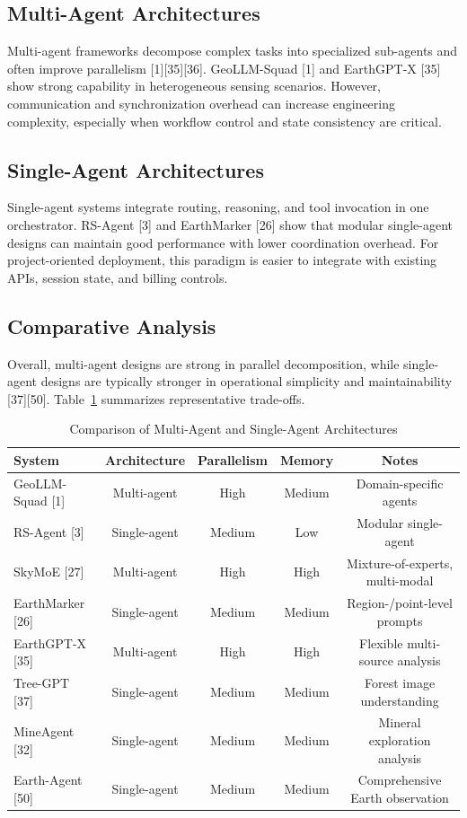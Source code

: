 {	\subsection{Multi-Agent Architectures}
	Multi-agent frameworks decompose complex tasks into specialized sub-agents and often improve parallelism [1][35][36]. GeoLLM-Squad [1] and EarthGPT-X [35] show strong capability in heterogeneous sensing scenarios. However, communication and synchronization overhead can increase engineering complexity, especially when workflow control and state consistency are critical.
	
	\subsection{Single-Agent Architectures}
	Single-agent systems integrate routing, reasoning, and tool invocation in one orchestrator. RS-Agent [3] and EarthMarker [26] show that modular single-agent designs can maintain good performance with lower coordination overhead. For project-oriented deployment, this paradigm is easier to integrate with existing APIs, session state, and billing controls.
	
	\subsection{Comparative Analysis}
	Overall, multi-agent designs are strong in parallel decomposition, while single-agent designs are typically stronger in operational simplicity and maintainability [37][50]. Table~\ref{tab:agent-architecture} summarizes representative trade-offs.
	
	\begin{table}[h!]
		\centering
		\footnotesize
		\caption{Comparison of Multi-Agent and Single-Agent Architectures}
		\label{tab:agent-architecture}
		\begin{tabular}{lcccc}
			\hline
			System & Architecture & Parallelism & Memory & Notes \\
			\hline
			GeoLLM-Squad [1] & Multi-agent & High & Medium & Domain-specific agents \\
			RS-Agent [3] & Single-agent & Medium & Low & Modular single-agent \\
			SkyMoE [27] & Multi-agent & High & High & Mixture-of-experts, multi-modal \\
			EarthMarker [26] & Single-agent & Medium & Medium & Region-/point-level prompts \\
			EarthGPT-X [35] & Multi-agent & High & High & Flexible multi-source analysis \\
			Tree-GPT [37] & Single-agent & Medium & Medium & Forest image understanding \\
			MineAgent [32] & Single-agent & Medium & Medium & Mineral exploration analysis \\
			Earth-Agent [50] & Single-agent & Medium & Medium & Comprehensive Earth observation \\
			\hline
		\end{tabular}
	\end{table}
	
}
